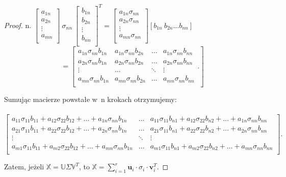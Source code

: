 \documentclass[12pt,a4paper]{report}
\begin{document}
\begin{proof}
n.
$\left[ \begin{array}{c}
         a_{1n} \\
         a_{2n} \\
         \vdots \\
         a_{mn} \\
         \end{array}
      \right] \: \sigma_{nn} \: \left[ \begin{array}{c}
         b_{1n} \\
         b_{2n} \\
         \vdots \\
         b_{nn} \\
         \end{array}
      \right]^T= \left[
        \begin{array}{c}
         a_{1n} \sigma_{nn} \\
         a_{2n} \sigma_{nn} \\
         \vdots \\
         a_{mn} \sigma_{nn} \\
         \end{array}
      \right] [b_{1n} \: b_{2n} \ldots b_{nn}] $
      $$=  \left[
        \begin{array}{cccc}
         a_{1n} \sigma_{nn} b_{1n}  & a_{1n} \sigma_{nn} b_{2n} & \ldots & a_{1n} \sigma_{nn} b_{nn}  \\
         a_{2n} \sigma_{nn} b_{1n} & a_{2n} \sigma_{nn} b_{2n} & \ldots & a_{2n} \sigma_{nn} b_{nn} \\
         \vdots & \ldots & \ddots & \vdots \\
         a_{mn} \sigma_{nn} b_{1n} & a_{mn} \sigma_{nn} b_{2n} & \ldots & a_{mn} \sigma_{nn} b_{nn} \\
         \end{array}.
      \right] $$

Sumując macierze powstałe w~n krokach otrzymujemy:
\\
\\$\left[
        \begin{array}{ccc}
a_{11} \sigma_{11} b_{11} + a_{12} \sigma_{22} b_{12} + \ldots + a_{1n} \sigma_{nn} b_{1n} & \ldots &  a_{11} \sigma_{11} b_{n1} + a_{12} \sigma_{22} b_{n2} + \ldots + a_{1n} \sigma_{nn} b_{nn} \\
a_{21} \sigma_{11} b_{11} + a_{22} \sigma_{22} b_{12} + \ldots + a_{2n} \sigma_{nn} b_{1n} & \ldots & a_{21} \sigma_{11} b_{n1} + a_{22} \sigma_{22} b_{n2} + \ldots + a_{2n} \sigma_{nn} b_{nn} \\
         \vdots & \ddots & \vdots \\
a_{m1} \sigma_{11} b_{11} + a_{m2} \sigma_{22} b_{12} + \ldots + a_{mn} \sigma_{nn} b_{1n} & \ldots & a_{m1} \sigma_{11} b_{n1} + a_{m2} \sigma_{22} b_{n2} + \ldots + a_{mn} \sigma_{nn} b_{nn} \\
         \end{array}
      \right].$

\bigskip
Zatem, jeżeli $\mathbb{X}=\mathbb{U} \Sigma \mathbb{V}^T$, to $\mathbb{X} = \sum_{i=1}^r \mathbf{u}_i \cdot\sigma_i \cdot \mathbf{v}_i^T$.
\end{proof}
\bigskip
\end{document}
